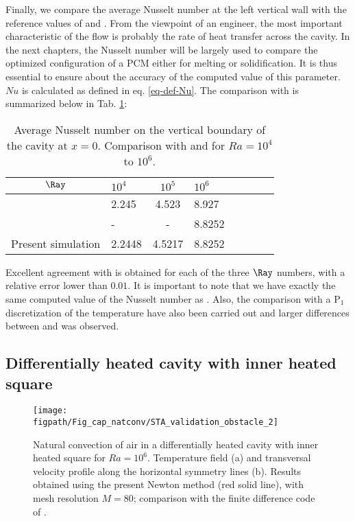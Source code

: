Finally, we compare the average Nusselt number at the left vertical wall with the reference values of \cite{de1983natural} and \cite{LeQuere91}.
From the viewpoint of an engineer, the most important characteristic of the flow is probably the rate of heat  transfer across the cavity.
In the next chapters, the Nusselt number will be largely used to compare the optimized configuration of a PCM either for melting or solidification.
It is thus essential to ensure about the accuracy of the computed value of this parameter.
$N\!u$ is calculated as defined in eq. \ref{eq-def-Nu}.
The comparison with \cite{de1983natural} is summarized below in Tab. \ref{tab-Nu-natconv}:
\begin{table}[ht!]
   \begin{center}
      \begin{tabular}{*{4}{cl}}
         
       $\Ray$ & $10^4$ &$ 10^5$ & $10^6 $ \\
         \hline
        \cite{de1983natural} & 2.245 & 4.523  & 8.927 \\
        \cite{LeQuere91} & - & - &  8.8252 \\
        Present simulation & 2.2448 & 4.5217  & 8.8252 \\
      \end{tabular}
   \end{center}
   \caption{Average Nusselt number on the vertical boundary of the cavity at $x=0$. Comparison with \cite{de1983natural} and \cite{LeQuere91} for $Ra = 10^4$ to $10^6$.}
   \label{tab-Nu-natconv}
\end{table}

Excellent agreement with \cite{de1983natural} is obtained for each of the three $\Ray$ numbers, with a relative error lower than $0.01$.
It is important to note that we have exactly the same computed value of the Nusselt number as \cite{LeQuere91}.
Also, the comparison with a P$_1$ discretization of the temperature have also been carried out and larger differences between \cite{de1983natural} and \cite{LeQuere91} was observed.

\subsection{Differentially heated cavity with inner heated square} \label{sub-2D-OBSTACLE}

\begin{figure}
	\begin{center}
		\texttt{[image: \\figpath/Fig\_cap\_natconv/STA\_validation\_obstacle\_2]} 
	\end{center}
	\caption{Natural convection of air in a differentially heated cavity with inner heated square for $Ra = 10^6$. Temperature field (a) and transversal velocity profile along the  horizontal symmetry lines (b). Results obtained using the present Newton method (red solid line), with mesh resolution $M=80$; comparison with the finite difference code of \cite{Raluca2013}.}
	\label{fig-obst-2D}
\end{figure}

